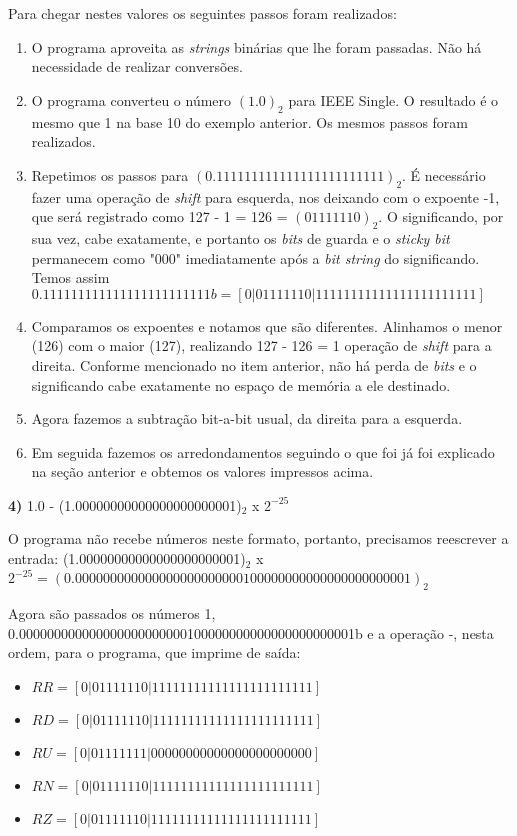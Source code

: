 \documentclass[11pt]{article}
\begin{document}
Para chegar nestes valores os seguintes passos foram realizados:
\begin{enumerate}
  \item O programa aproveita as \textit{strings} binárias que lhe foram passadas. Não há necessidade de realizar conversões.
  \item O programa converteu o número $(1.0)_2$ para IEEE Single. O resultado é o mesmo que 1 na base 10 do exemplo anterior. Os mesmos passos foram realizados.
  \item Repetimos os passos para $(0.111111111111111111111111)_2$. É necessário fazer uma operação de \textit{shift} para esquerda, nos deixando com o expoente -1, que será registrado como 127 - 1 = 126 = $(01111110)_2$.
  O significando, por sua vez, cabe exatamente, e portanto os \textit{bits} de guarda e o \textit{sticky bit} permanecem como "000" imediatamente após a \textit{bit string} do significando. Temos assim
  {\small$0.111111111111111111111111b = [ 0 | 0 1 1 1 1 1 1 0 | 1 1 1 1 1 1 1 1 1 1 1 1 1 1 1 1 1 1 1 1 1 1 1 ] $}
  \item Comparamos os expoentes e notamos que são diferentes. Alinhamos o menor (126) com o maior (127), realizando 127 - 126 = 1 operação de \textit{shift} para a direita. Conforme mencionado no item anterior,
  não há perda de \textit{bits} e o significando cabe exatamente no espaço de memória a ele destinado.
  \item Agora fazemos a subtração bit-a-bit usual, da direita para a esquerda.

  \item Em seguida fazemos os arredondamentos seguindo o que foi já foi explicado na seção anterior e obtemos os valores impressos acima.
\end{enumerate}

\textbf{4)} 1.0 - (1.00000000000000000000001)$_2$ x $2^{-25} $

O programa não recebe números neste formato, portanto, precisamos reescrever a entrada:
(1.00000000000000000000001)$_2$ x $2^{-25} = (0.000000000000000000000000100000000000000000000001)_2 $

Agora são passados os números 1, 0.000000000000000000000000100000000000000000000001b e a operação -, nesta ordem, para o programa, que imprime de saída:

\begin{itemize}
  \item {\small$ RR = [ 0 | 0 1 1 1 1 1 1 0 | 1 1 1 1 1 1 1 1 1 1 1 1 1 1 1 1 1 1 1 1 1 1 1 ] $}
  \item {\small$ RD = [ 0 | 0 1 1 1 1 1 1 0 | 1 1 1 1 1 1 1 1 1 1 1 1 1 1 1 1 1 1 1 1 1 1 1 ] $}
  \item {\small$ RU = [ 0 | 0 1 1 1 1 1 1 1 | 0 0 0 0 0 0 0 0 0 0 0 0 0 0 0 0 0 0 0 0 0 0 0 ] $}
  \item {\small$ RN = [ 0 | 0 1 1 1 1 1 1 0 | 1 1 1 1 1 1 1 1 1 1 1 1 1 1 1 1 1 1 1 1 1 1 1 ] $}
  \item {\small$ RZ = [ 0 | 0 1 1 1 1 1 1 0 | 1 1 1 1 1 1 1 1 1 1 1 1 1 1 1 1 1 1 1 1 1 1 1 ] $}
\end{itemize}
\end{document}
